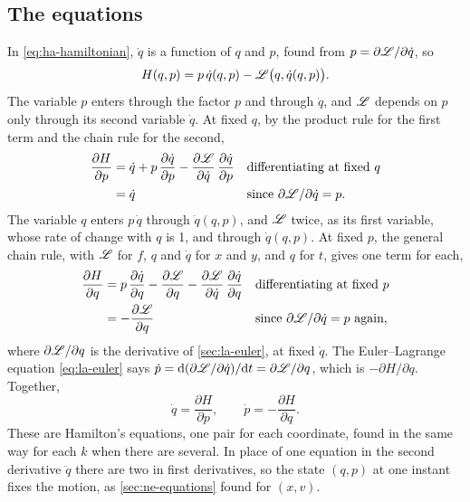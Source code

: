 \subsection*{The equations}

In \cref{eq:ha-hamiltonian}, $\dot{q}$ is a function of $q$ and $p$,
found from $p = \partial\mathscr{L}/\partial\dot{q}$, so
\begin{equation*}
   H(q, p) = p\,\dot{q}(q, p) - \mathscr{L}\bigl(q, \dot{q}(q, p)\bigr) .
\end{equation*}
The variable $p$ enters through the factor $p$ and through $\dot{q}$, and
$\mathscr{L}$ depends on $p$ only through its second variable $\dot{q}$. At fixed
$q$, by the product rule for the first term and the chain rule for the
second,
\begin{align*}
   \frac{\partial H}{\partial p}
   &= \dot{q} + p\,\frac{\partial\dot{q}}{\partial p}
   - \frac{\partial\mathscr{L}}{\partial\dot{q}}\,\frac{\partial\dot{q}}
   {\partial p}
   && \text{differentiating at fixed $q$}\\
   &= \dot{q}
   && \text{since $\partial\mathscr{L}/\partial\dot{q} = p$.}
\end{align*}
The variable $q$ enters $p\,\dot{q}$ through $\dot{q}(q, p)$, and $\mathscr{L}$
twice, as its first variable, whose rate of change with $q$ is 1, and
through $\dot{q}(q, p)$. At fixed $p$, the general chain rule, with $\mathscr{L}$
for $f$, $q$ and $\dot{q}$ for $x$ and $y$, and $q$ for $t$, gives one
term for each,
\begin{align*}
   \frac{\partial H}{\partial q}
   &= p\,\frac{\partial\dot{q}}{\partial q}
   - \frac{\partial\mathscr{L}}{\partial q}
   - \frac{\partial\mathscr{L}}{\partial\dot{q}}\,\frac{\partial\dot{q}}
   {\partial q}
   && \text{differentiating at fixed $p$}\\
   &= -\frac{\partial\mathscr{L}}{\partial q}
   && \text{since $\partial\mathscr{L}/\partial\dot{q} = p$ again,}
\end{align*}
where $\partial\mathscr{L}/\partial q$ is the derivative of \cref{sec:la-euler},
at fixed $\dot{q}$. The Euler--Lagrange equation \cref{eq:la-euler} says
$\dot{p} = \mathrm{d}(\partial\mathscr{L}/\partial\dot{q})/\mathrm{d} t = \partial\mathscr{L}/
\partial q$, which is $-\partial H/\partial q$. Together,
\begin{equation}
   \dot{q} = \frac{\partial H}{\partial p} ,
   \qquad
   \dot{p} = -\frac{\partial H}{\partial q} .
   \label{eq:ha-hamilton}
\end{equation}
These are Hamilton's equations, one pair for each coordinate, found in
the same way for each $k$ when there are several. In place of one
equation in the second derivative $\ddot{q}$ there are two in first
derivatives, so the state $(q, p)$ at one instant fixes the motion, as
\cref{sec:ne-equations} found for $(x, v)$.

